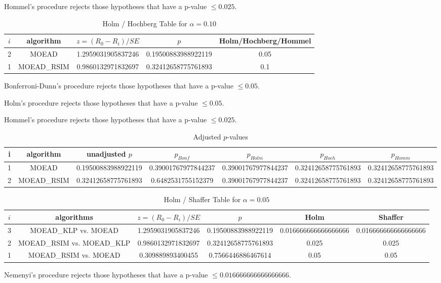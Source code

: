 \documentclass[a4paper,10pt]{article}
\begin{document}
\begin{landscape}
Hommel's procedure rejects those hypotheses that have a p-value $\le0.025$.


\begin{table}[!htp]
\centering\tiny
\caption{Holm / Hochberg Table for $\alpha=0.10$}
\begin{tabular}{ccccc}
$i$&algorithm&$z=(R_0 - R_i)/SE$&$p$&Holm/Hochberg/Hommel\\
\hline
2&MOEAD&1.2959031905837246&0.19500883988922119&0.05\\
1&MOEAD_RSIM&0.9860132971832697&0.32412658775761893&0.1\\
\hline
\end{tabular}
\end{table}
Bonferroni-Dunn's procedure rejects those hypotheses that have a p-value $\le0.05$.


Holm's procedure rejects those hypotheses that have a p-value $\le0.05$.


Hommel's procedure rejects those hypotheses that have a p-value $\le0.025$.


\begin{table}[!htp]
\centering\tiny
\caption{Adjusted $p$-values}
\begin{tabular}{ccccccc}
i&algorithm&unadjusted $p$&$p_{Bonf}$&$p_{Holm}$&$p_{Hoch}$&$p_{Homm}$\\
\hline
1&MOEAD&0.19500883988922119&0.39001767977844237&0.39001767977844237&0.32412658775761893&0.32412658775761893\\
2&MOEAD_RSIM&0.32412658775761893&0.6482531755152379&0.39001767977844237&0.32412658775761893&0.32412658775761893\\
\hline
\end{tabular}
\end{table}

\begin{table}[!htp]
\centering\tiny
\caption{Holm / Shaffer Table for $\alpha=0.05$}
\begin{tabular}{cccccc}
$i$&algorithms&$z=(R_0 - R_i)/SE$&$p$&Holm&Shaffer\\
\hline
3&MOEAD_KLP vs. MOEAD&1.2959031905837246&0.19500883988922119&0.016666666666666666&0.016666666666666666\\
2&MOEAD_RSIM vs. MOEAD_KLP&0.9860132971832697&0.32412658775761893&0.025&0.025\\
1&MOEAD_RSIM vs. MOEAD&0.309889893400455&0.7566446886467614&0.05&0.05\\
\hline
\end{tabular}
\end{table}
Nemenyi's procedure rejects those hypotheses that have a p-value $\le0.016666666666666666$.



\end{landscape}
\end{document}
